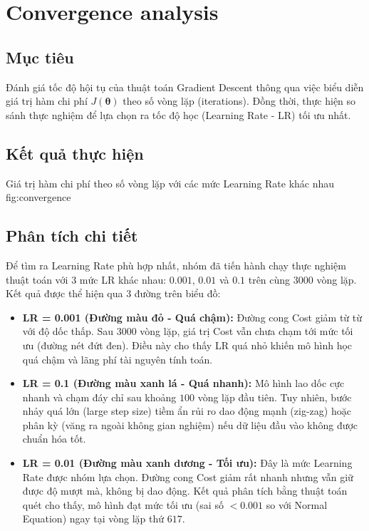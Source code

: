 \section{Convergence analysis}

\subsection{Mục tiêu}
Đánh giá tốc độ hội tụ của thuật toán Gradient Descent thông qua việc biểu diễn giá trị hàm chi phí \(J(\boldsymbol{\theta})\) theo số vòng lặp (iterations). Đồng thời, thực hiện so sánh thực nghiệm để lựa chọn ra tốc độ học (Learning Rate - LR) tối ưu nhất.

\subsection{Kết quả thực hiện}

{Giá trị hàm chi phí theo số vòng lặp với các mức Learning Rate khác nhau}
{fig:convergence}

\subsection{Phân tích chi tiết}
Để tìm ra Learning Rate phù hợp nhất, nhóm đã tiến hành chạy thực nghiệm thuật toán với 3 mức LR khác nhau: \(0.001\), \(0.01\) và \(0.1\) trên cùng \(3000\) vòng lặp. Kết quả được thể hiện qua 3 đường trên biểu đồ:

\begin{itemize}
    \item \textbf{LR = 0.001 (Đường màu đỏ - Quá chậm):} Đường cong Cost giảm từ từ với độ dốc thấp. Sau \(3000\) vòng lặp, giá trị Cost vẫn chưa chạm tới mức tối ưu (đường nét đứt đen). Điều này cho thấy LR quá nhỏ khiến mô hình học quá chậm và lãng phí tài nguyên tính toán.
    
    \item \textbf{LR = 0.1 (Đường màu xanh lá - Quá nhanh):} Mô hình lao dốc cực nhanh và chạm đáy chỉ sau khoảng \(100\) vòng lặp đầu tiên. Tuy nhiên, bước nhảy quá lớn (large step size) tiềm ẩn rủi ro dao động mạnh (zig-zag) hoặc phân kỳ (văng ra ngoài không gian nghiệm) nếu dữ liệu đầu vào không được chuẩn hóa tốt.
    
    \item \textbf{LR = 0.01 (Đường màu xanh dương - Tối ưu):} Đây là mức Learning Rate được nhóm lựa chọn. Đường cong Cost giảm rất nhanh nhưng vẫn giữ được độ mượt mà, không bị dao động. Kết quả phân tích bằng thuật toán quét cho thấy, mô hình đạt mức tối ưu (sai số \(< 0.001\) so với Normal Equation) ngay tại vòng lặp thứ \(617\).
\end{itemize}

